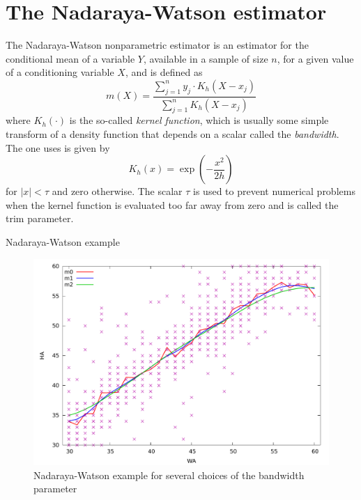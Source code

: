 \section{The Nadaraya-Watson estimator}
\label{sec:genr-nadarwat}

The Nadaraya-Watson nonparametric estimator is an estimator for the
conditional mean of a variable $Y$, available in a sample of size $n$,
for a given value of a conditioning variable $X$, and is defined as
\[
  m(X) = \frac{ \sum_{j=1}^{n} y_j \cdot K_h(X - x_j)} {\sum_{j=1}^{n} K_h(X - x_j)}
\]
where $K_h(\cdot)$ is the so-called \emph{kernel function}, which is
usually some simple transform of a density function that depends on a
scalar called the \emph{bandwidth}. The one  uses is given
by
\[
  K_h(x) = \exp\left(-\frac{x^2}{2h}\right)
\]
for $|x| < \tau$ and zero otherwise. The scalar $\tau$ is used to
prevent numerical problems when the kernel function is evaluated too
far away from zero and is called the trim parameter.

\begin{script}[htbp]
  \caption{Nadaraya-Watson example}
  \label{scr:nadarwat-ex}
\end{script}

\begin{figure}[htbp]
  \centering
  \includegraphics[scale=0.5]{figures/nadarwat-ex}
  \caption{Nadaraya-Watson example for several choices of the bandwidth parameter}
  \label{fig:nadarwat-ex}
\end{figure}

